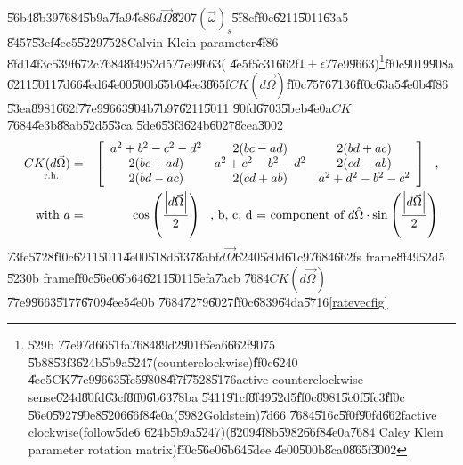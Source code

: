 \documentclass[12pt]{article}
\begin{document}
\U{56b4}\U{8b39}\U{7684}\U{5b9a}\U{7fa9}\U{4e86}$d\vec{\Omega}$\U{8207}$%
\left( \vec{\omega}\right) _{s}$\U{5f8c}\U{ff0c}\U{6211}\U{5011}\U{63a5}%
\U{8457}\U{53ef}\U{4ee5}\U{5229}\U{7528}Calvin Klein parameter\U{4f86}%
\U{8fd1}\U{4f3c}\U{539f}\U{672c}\U{7684}\U{8f49}\U{52d5}\U{77e9}\U{9663}(%
\U{4e5f}\U{5c31}\U{662f}$1+\epsilon $\U{77e9}\U{9663})\footnote{\U{529b}%
\U{77e9}\U{7d66}\U{51fa}\U{7684}\U{89d2}\U{901f}\U{5ea6}\U{662f}\U{9075}%
\U{5b88}\U{53f3}\U{624b}\U{5b9a}\U{5247}(counterclockwise)\U{ff0c}\U{6240}%
\U{4ee5}CK\U{77e9}\U{9663}\U{5fc5}\U{9808}\U{4f7f}\U{7528}\U{5176}active
counterclockwise sense\U{624d}\U{80fd}\U{63cf}\U{8ff0}\U{6b63}\U{78ba}%
\U{5411}\U{91cf}\U{8f49}\U{52d5}\U{ff0c}\U{8981}\U{5c0f}\U{5fc3}\U{ff0c}%
\U{56e0}\U{5927}\U{90e8}\U{5206}\U{66f8}\U{4e0a}(\U{5982}Goldstein)\U{7d66}%
\U{7684}\U{516c}\U{5f0f}\U{90fd}\U{662f}active clockwise(follow\U{5de6}%
\U{624b}\U{5b9a}\U{5247})(\U{8209}\U{4f8b}\U{5982}\U{66f8}\U{4e0a}\U{7684}%
Caley Klein parameter rotation matrix)\U{ff0c}\U{56e0}\U{6b64}\U{5dee}%
\U{4e00}\U{500b}\U{8ca0}\U{865f}\U{3002}\bigskip}\U{ff0c}\U{9019}\U{908a}%
\U{6211}\U{5011}\U{7d66}\U{4ed6}\U{4e00}\U{500b}\U{65b0}\U{4ee3}\U{865f}$CK(d%
\vec{\Omega})$\U{ff0c}\U{7576}\U{7136}\U{ff0c}\U{63a5}\U{4e0b}\U{4f86}%
\U{53ea}\U{8981}\U{662f}\U{77e9}\U{9663}\U{904b}\U{7b97}\U{6211}\U{5011}%
\U{90fd}\U{6703}\U{5beb}\U{4e0a}$CK$\U{7684}\U{4e3b}\U{88ab}\U{52d5}\U{53ca}%
\U{5de6}\U{53f3}\U{624b}\U{6027}\U{8cea}\U{3002}%
\begin{eqnarray*}
\underset{\text{r.h.}}{CK(d\vec{\Omega})} &=&\left[ 
\begin{array}{ccc}
a^{2}+b^{2}-c^{2}-d^{2} & 2(bc-ad) & 2(bd+ac) \\ 
2(bc+ad) & a^{2}+c^{2}-b^{2}-d^{2} & 2(cd-ab) \\ 
2(bd-ac) & 2(cd+ab) & a^{2}+d^{2}-b^{2}-c^{2}%
\end{array}%
\right] \text{,} \\
\text{with }a &=&\cos \left( \frac{\left\vert d\vec{\Omega}\right\vert }{2}%
\right) \text{, b, c, d = component of }d\hat{\Omega}\cdot \sin \left( \frac{%
\left\vert d\vec{\Omega}\right\vert }{2}\right)
\end{eqnarray*}%
\U{73fe}\U{5728}\U{ff0c}\U{6211}\U{5011}\U{4e00}\U{518d}\U{5f37}\U{8abf}$d%
\vec{\Omega}$\U{6240}\U{5c0d}\U{61c9}\U{7684}\U{662f}s frame\U{8f49}\U{52d5}%
\U{5230}b frame\U{ff0c}\U{56e0}\U{6b64}\U{6211}\U{5011}\U{5efa}\U{7acb}%
\U{7684}$CK(d\vec{\Omega})$\U{77e9}\U{9663}\U{5177}\U{6709}\U{4ee5}\U{4e0b}%
\U{7684}\U{7279}\U{6027}\U{ff0c}\U{6839}\U{64da}\U{5716}\ref{ratevecfig}%
\end{document}
